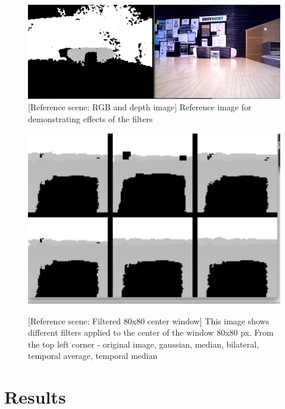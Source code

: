 \documentclass[11pt]{article}
\begin{document}
\begin{figure}[ht]
  \centering
  \includegraphics[width=1\textwidth]{figures/reference_rgb_depth.png}
  [Reference scene: RGB and depth image]{\label{fig:refimage}
    Reference image for demonstrating effects of the filters}
\end{figure}
\begin{figure}[ht]
  \centering
  \includegraphics[width=1\textwidth]{figures/applied_filters_center.png}
  
  [Reference scene: Filtered 80x80 center
  window]{\label{fig:filterswindow} This image shows different filters applied
    to the center of the window 80x80 px. From the top left corner - original
    image, gaussian, median, bilateral, temporal average, temporal median}
\end{figure}

\section{Results}


\end{document}
